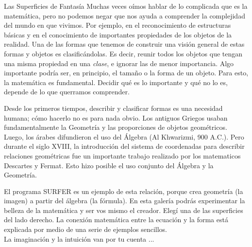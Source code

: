 \begin{surferIntroPage}{Las Superficies de Fantasía}
Muchas veces oímos hablar de lo complicada que es la matemática, pero no podemos negar que nos ayuda a comprender la complejidad del mundo en que vivimos. Por ejemplo, en el reconocimiento de estructuras básicas y en el conocimiento de importantes propiedades de los objetos de la realidad. Una de las formas que tenemos de construir una visión general de estas formas y objetos es clasificándolas. Es decir, reunir todos los objetos que tengan una misma propiedad en una \textit{clase}, e ignorar las de menor importancia. Algo importante podría ser, en principio, el tamaño o la forma de un objeto. Para esto, la matemática es fundamental. Decidir qué es lo importante y qué no lo es, depende de lo que querramos comprender.

Desde los primeros tiempos, describir y clasificar formas es una necesidad humana; cómo hacerlo no es para nada obvio. Los antiguos Griegos usaban fundamentalmente la Geometría y las proporciones de objetos geométricos. Luego, los árabes difundieron el uso del Álgebra (Al Khwarizmi, 900 A.C.). Pero durante el siglo XVIII, la introducción del sistema de coordenadas para describir relaciones geométricas fue un importante trabajo realizado por los matematicos Descartes y Fermat. Esto hizo posible el uso conjunto del Álgebra y la Geometría.

El programa SURFER es un ejemplo de esta relación, porque crea geometría (la imagen) a partir del álgebra (la fórmula).
En esta galería podrás experimentar la belleza de la matemática y ser vos mismo el creador. Elegí una de las superficies del lado derecho. La conexión matemática entre la ecuación y la forma está explicada por medio de una serie de ejemplos sencillos. \\
La imaginación y la intuición van por tu cuenta ...
\end{surferIntroPage}
